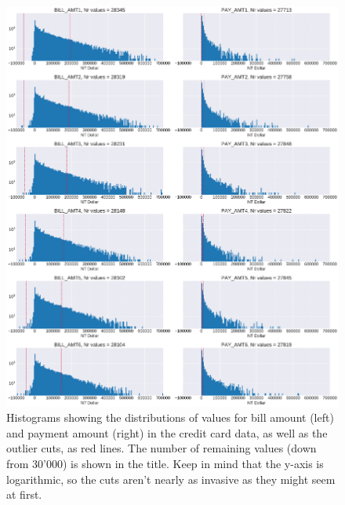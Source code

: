 \documentclass[10pt, twocolumn]{article}
\begin{document}
\begin{appendices}
\begin{figure}[h]
    \centering
    \includegraphics[scale=0.38]{../figs/CC_IQR_cuts_BILL_PAY.pdf}
    \caption{Histograms showing the distributions of values for bill amount (left) and payment amount (right) in the credit card data, as well as the outlier cuts, as red lines. The number of remaining values (down from 30'000) is shown in the title. Keep in mind that the y-axis is logarithmic, so the cuts aren't nearly as invasive as they might seem at first.}
    \label{fig:app4}
\end{figure}



\end{appendices}
\end{document}
